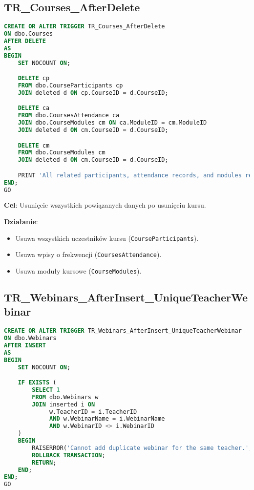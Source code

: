 \documentclass[12pt]{article}
\begin{document}
\vspace{1em}

\subsection{TR\_Courses\_AfterDelete}

\begin{lstlisting}[language=SQL]
CREATE OR ALTER TRIGGER TR_Courses_AfterDelete
ON dbo.Courses
AFTER DELETE
AS
BEGIN
    SET NOCOUNT ON;

    DELETE cp
    FROM dbo.CourseParticipants cp
    JOIN deleted d ON cp.CourseID = d.CourseID;

    DELETE ca
    FROM dbo.CoursesAttendance ca
    JOIN dbo.CourseModules cm ON ca.ModuleID = cm.ModuleID
    JOIN deleted d ON cm.CourseID = d.CourseID;

    DELETE cm
    FROM dbo.CourseModules cm
    JOIN deleted d ON cm.CourseID = d.CourseID;

    PRINT 'All related participants, attendance records, and modules removed.';
END;
GO
\end{lstlisting}


\noindent \textbf{Cel}: Usunięcie wszystkich powiązanych danych po usunięciu kursu.  

\noindent \textbf{Działanie}:  
\begin{itemize}
    \item Usuwa wszystkich uczestników kursu (\texttt{CourseParticipants}).
    \item Usuwa wpisy o frekwencji (\texttt{CoursesAttendance}).
    \item Usuwa moduły kursowe (\texttt{CourseModules}).
\end{itemize}

\vspace{1em}

\newpage

\subsection{TR\_Webinars\_AfterInsert\_UniqueTeacherWebinar}
\begin{lstlisting}[language=SQL]
CREATE OR ALTER TRIGGER TR_Webinars_AfterInsert_UniqueTeacherWebinar
ON dbo.Webinars
AFTER INSERT
AS
BEGIN
    SET NOCOUNT ON;

    IF EXISTS (
        SELECT 1
        FROM dbo.Webinars w
        JOIN inserted i ON
             w.TeacherID = i.TeacherID
             AND w.WebinarName = i.WebinarName
             AND w.WebinarID <> i.WebinarID
    )
    BEGIN
        RAISERROR('Cannot add duplicate webinar for the same teacher.', 16, 1);
        ROLLBACK TRANSACTION;
        RETURN;
    END;
END;
GO
\end{lstlisting}
\end{document}
